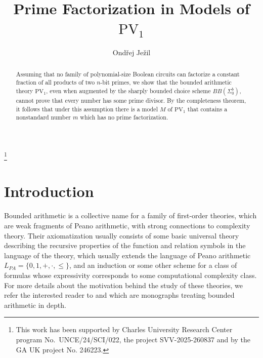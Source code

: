 \documentclass{lmcs}
\newcommand{\PV}{\text{PV}}
\begin{document}
\title{Prime Factorization in Models of $\text{PV}_1$}
\author[O.~Ježil]{Ondřej Ježil}
\address{Faculty of Mathematics and Physics, Charles University}
\thanks{This work has been supported by Charles University Research Center program No.~UNCE/24/SCI/022,
the project SVV-2025-260837 and by the GA UK project No. 246223.} 

\begin{abstract}
Assuming that no family of polynomial-size Boolean circuits can factorize a constant fraction of all products of two $n$-bit primes, we show that the bounded arithmetic theory $\PV_1$, even when augmented by the sharply bounded choice scheme $BB(\Sigma^b_0)$, cannot prove that every number has some prime divisor. By the completeness theorem, it follows that under this assumption there is a model $M$ of $\PV_1$ that contains a nonstandard number $m$ which has no prime factorization.
\end{abstract}

\maketitle

\section{Introduction}

Bounded arithmetic is a collective name for a family of first-order theories, which are weak fragments of Peano arithmetic, with strong connections to complexity theory. Their axiomatization usually consists of some basic universal theory describing the recursive properties of the function and relation symbols in the language of the theory, which usually extends the language of Peano arithmetic $L_{PA}=\{0,1,+,\cdot, \leq\}$, and an induction or some other scheme for a class of formulas whose expressivity corresponds to some computational complexity class. For more details about the motivation behind the study of these theories, we refer the interested reader to \cite{krajicek1995bounded} and \cite{cook2010logical} which are monographs treating bounded arithmetic in depth.
\end{document}
